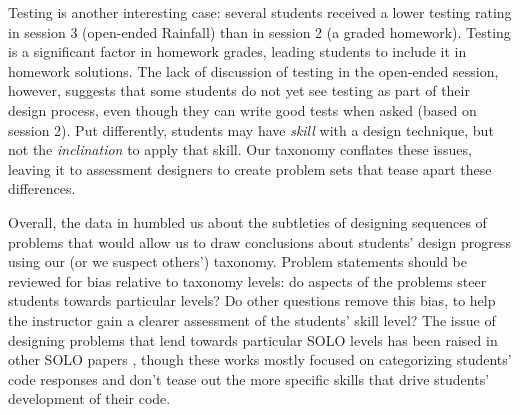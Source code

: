 Testing is another interesting case: several students received a lower
testing rating in session 3 (open-ended Rainfall) than in session 2 (a
graded homework).  Testing is a significant factor in homework grades,
leading students to include it in homework solutions.  The lack
of discussion of testing in the open-ended session, however, suggests
that some students do not yet see testing as part of their design
process, even though they can write good tests when asked (based
on session 2).  Put differently, students may have \emph{skill} with a
design technique, but not the \emph{inclination} to apply that skill.
Our taxonomy conflates these issues, leaving it to assessment
designers to create problem sets that tease apart these differences.

Overall, the data in  humbled us about the
subtleties of designing sequences of problems that would allow us to
draw conclusions about students' design progress using our (or we
suspect others') taxonomy. Problem statements should be reviewed for
bias relative to taxonomy levels: do aspects of the problems steer
students towards particular levels?  Do other questions remove this
bias, to help the instructor gain a clearer assessment of the
students' skill level?
The issue of designing problems that lend towards particular SOLO levels has been raised in other SOLO papers \cite{lister_naturally_2010, whalley_salient_2011}, though these works mostly focused on categorizing students' code responses and don't tease out the more specific skills that drive students' development of their code.



